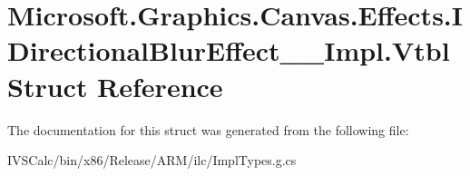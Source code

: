 \hypertarget{struct_microsoft_1_1_graphics_1_1_canvas_1_1_effects_1_1_i_directional_blur_effect_____impl_1_1_vtbl}{}\section{Microsoft.\+Graphics.\+Canvas.\+Effects.\+I\+Directional\+Blur\+Effect\+\_\+\+\_\+\+Impl.\+Vtbl Struct Reference}
\label{struct_microsoft_1_1_graphics_1_1_canvas_1_1_effects_1_1_i_directional_blur_effect_____impl_1_1_vtbl}


The documentation for this struct was generated from the following file\+:\begin{DoxyCompactItemize}
\item 
I\+V\+S\+Calc/bin/x86/\+Release/\+A\+R\+M/ilc/Impl\+Types.\+g.\+cs\end{DoxyCompactItemize}

